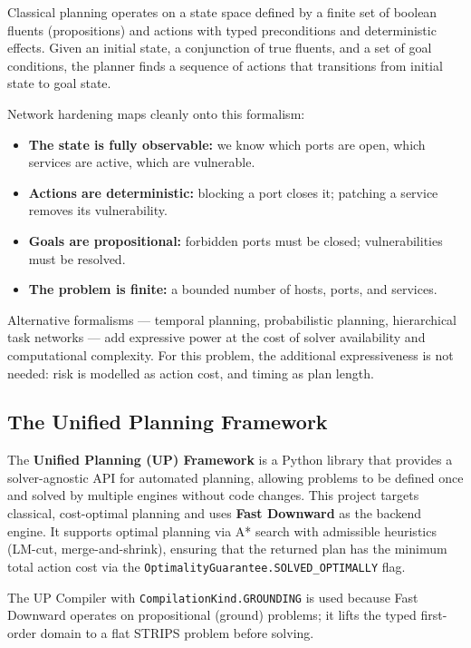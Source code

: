 \documentclass[12pt,a4paper]{article}
\begin{document}
	Classical planning operates on a state space defined by a finite set of boolean fluents
	(propositions) and actions with typed preconditions and deterministic effects. Given an initial
	state, a conjunction of true fluents, and a set of goal conditions, the planner finds a sequence
	of actions that transitions from initial state to goal state.
	
	Network hardening maps cleanly onto this formalism:
	
	\begin{itemize}[leftmargin=1.5em]
		\item \textbf{The state is fully observable:} we know which ports are open, which services are active, which are vulnerable.
		\item \textbf{Actions are deterministic:} blocking a port closes it; patching a service removes its vulnerability.
		\item \textbf{Goals are propositional:} forbidden ports must be closed; vulnerabilities must be resolved.
		\item \textbf{The problem is finite:} a bounded number of hosts, ports, and services.
	\end{itemize}
	
	Alternative formalisms --- temporal planning, probabilistic planning, hierarchical task networks
	--- add expressive power at the cost of solver availability and computational complexity. For this
	problem, the additional expressiveness is not needed: risk is modelled as action cost, and timing
	as plan length.
	
	\subsection{The Unified Planning Framework}
	
	The \textbf{Unified Planning (UP) Framework} is a Python library that provides a solver-agnostic
	API for automated planning, allowing problems to be defined once and solved by multiple engines
	without code changes. This project targets classical, cost-optimal planning and uses
	\textbf{Fast Downward} as the backend engine. It supports optimal planning via A* search with
	admissible heuristics (LM-cut, merge-and-shrink), ensuring that the returned plan has the minimum
	total action cost via the \texttt{OptimalityGuarantee.SOLVED\_OPTIMALLY} flag.
	
	The UP Compiler with \texttt{CompilationKind.GROUNDING} is used because Fast Downward operates on
	propositional (ground) problems; it lifts the typed first-order domain to a flat STRIPS problem
	before solving.
	\newpage
\end{document}
